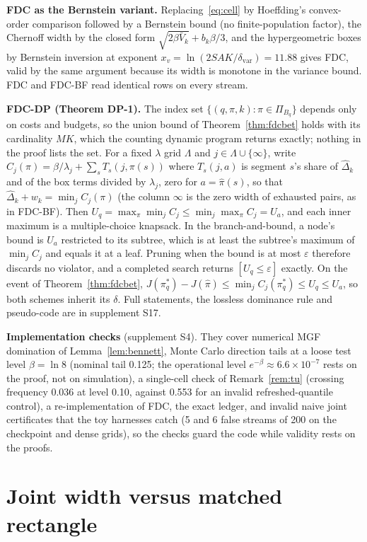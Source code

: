 \documentclass[sigconf,anonymous,review]{acmart}
\newcommand{\eps}{\varepsilon}
\newcommand{\dvar}{\delta_{\text{var}}}
\begin{document}
\textbf{FDC as the Bernstein variant.} Replacing~\eqref{eq:cell} by Hoeffding's convex-order comparison followed by a Bernstein bound (no finite-population factor), the Chernoff width by the closed form $\sqrt{2\beta\bar V_k} + b_k\beta/3$, and the hypergeometric boxes by Bernstein inversion at exponent $x_v = \ln(2SAK/\dvar) = 11.88$ gives FDC, valid by the same argument because its width is monotone in the variance bound. FDC and FDC-BF read identical rows on every stream.

\textbf{FDC-DP (Theorem DP-1).} The index set $\{(q, \pi, k) : \pi \in \Pi_{B_q}\}$ depends only on costs and budgets, so the union bound of Theorem~\ref{thm:fdcbet} holds with its cardinality $MK$, which the counting dynamic program returns exactly; nothing in the proof lists the set. For a fixed $\lambda$ grid $\Lambda$ and $j \in \Lambda \cup \{\infty\}$, write $C_j(\pi) = \beta/\lambda_j + \sum_s T_s(j, \pi(s))$ where $T_s(j, a)$ is segment $s$'s share of $\hat\Delta_k$ and of the box terms divided by $\lambda_j$, zero for $a = \hat\pi(s)$, so that $\hat\Delta_k + w_k = \min_j C_j(\pi)$ (the column $\infty$ is the zero width of exhausted pairs, as in FDC-BF). Then $U_q = \max_\pi \min_j C_j \le \min_j \max_\pi C_j = U_a$, and each inner maximum is a multiple-choice knapsack. In the branch-and-bound, a node's bound is $U_a$ restricted to its subtree, which is at least the subtree's maximum of $\min_j C_j$ and equals it at a leaf. Pruning when the bound is at most $\eps$ therefore discards no violator, and a completed search returns $[U_q \le \eps]$ exactly. On the event of Theorem~\ref{thm:fdcbet}, $J(\pi^*_q) - J(\hat\pi) \le \min_j C_j(\pi^*_q) \le U_q \le U_a$, so both schemes inherit its $\delta$. Full statements, the lossless dominance rule and pseudo-code are in supplement S17.

\textbf{Implementation checks} (supplement S4). They cover numerical MGF domination of Lemma~\ref{lem:bennett}, Monte Carlo direction tails at a loose test level $\beta = \ln 8$ (nominal tail 0.125; the operational level $e^{-\beta} \approx 6.6 \times 10^{-7}$ rests on the proof, not on simulation), a single-cell check of Remark~\ref{rem:tu} (crossing frequency 0.036 at level 0.10, against 0.553 for an invalid refreshed-quantile control), a re-implementation of FDC, the exact ledger, and invalid naive joint certificates that the toy harnesses catch (5 and 6 false streams of 200 on the checkpoint and dense grids), so the checks guard the code while validity rests on the proofs.

\section{Joint width versus matched rectangle}\label{app:widthprop}
\end{document}

